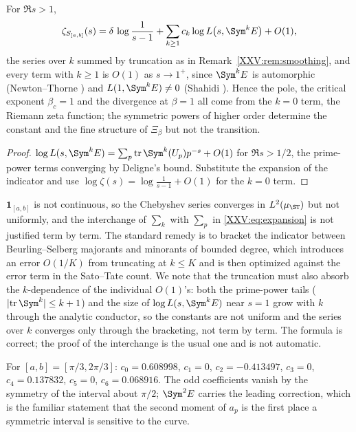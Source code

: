 \begin{theorem}\label{XXV:thm:expansion}
For $\Re s>1$,
\begin{equation}\label{XXV:eq:expansion}
\zeta_{S_{[a,b]}}(s)=\delta\,\log\frac{1}{s-1}+\sum_{k\ge1}c_k\log L\bigl(s,\Sym^kE\bigr)+O(1),
\end{equation}
the series over $k$ summed by truncation as in Remark~\ref{XXV:rem:smoothing}, and every term
with $k\ge1$ is $O(1)$ as $s\to1^+$, since $\Sym^kE$ is automorphic
(Newton--Thorne \cite{NT}) and $L(1,\Sym^kE)\ne0$ (Shahidi \cite{Shahidi}). Hence the pole, the critical exponent
$\beta_c=1$ and the divergence at $\beta=1$ all come from the $k=0$ term, the Riemann zeta
function; the symmetric powers of higher order determine the constant and the fine structure
of $\Xi_\beta$ but not the transition.
\end{theorem}

\begin{proof}
$\log L(s,\Sym^kE)=\sum_p\Tr\Sym^k(U_p)p^{-s}+O(1)$ for $\Re s>1/2$, the prime-power terms
converging by Deligne's bound. Substitute the expansion of the indicator and use
$\log\zeta(s)=\log\frac{1}{s-1}+O(1)$ for the $k=0$ term.
\end{proof}

\begin{remark}\label{XXV:rem:smoothing}
$\mathbf 1_{[a,b]}$ is not continuous, so the Chebyshev series converges in $L^2(\mu_\ST)$
but not uniformly, and the interchange of $\sum_k$ with $\sum_p$ in \eqref{XXV:eq:expansion} is
not justified term by term. The standard remedy is to bracket the indicator between
Beurling--Selberg majorants and minorants of bounded degree, which introduces an error
$O(1/K)$ from truncating at $k\le K$ and is then optimized against the error term in the
Sato--Tate count. We note that the truncation must also absorb the $k$-dependence of the
individual $O(1)$'s: both the prime-power tails ($|\mathrm{tr}\,\Sym^k|\le k+1$) and the
size of $\log L(s,\Sym^kE)$ near $s=1$ grow with $k$ through the analytic conductor, so the
constants are not uniform and the series over $k$ converges only through the bracketing, not
term by term. The formula is correct; the proof of the interchange is the usual one and
is not automatic.
\end{remark}

\begin{example}[Coefficients]\label{XXV:ex:coeffs}
For $[a,b]=[\pi/3,2\pi/3]$: $c_0=0.608998$, $c_1=0$, $c_2=-0.413497$, $c_3=0$,
$c_4=0.137832$, $c_5=0$, $c_6=0.068916$. The odd coefficients vanish by the symmetry of the
interval about $\pi/2$; $\Sym^2E$ carries the leading correction, which is the familiar
statement that the second moment of $a_p$ is the first place a symmetric interval is
sensitive to the curve.
\end{example}

